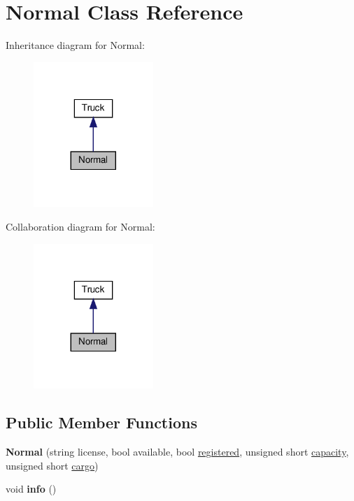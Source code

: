\hypertarget{class_normal}{}\section{Normal Class Reference}
\label{class_normal}


Inheritance diagram for Normal\+:\nopagebreak
\begin{figure}[H]
\begin{center}
\leavevmode
\includegraphics[width=128pt]{class_normal__inherit__graph}
\end{center}
\end{figure}


Collaboration diagram for Normal\+:\nopagebreak
\begin{figure}[H]
\begin{center}
\leavevmode
\includegraphics[width=128pt]{class_normal__coll__graph}
\end{center}
\end{figure}
\subsection*{Public Member Functions}
\begin{DoxyCompactItemize}
\item 
\mbox{\label{class_normal_a5bfcd1d763c6cf56bdcf4de370903da7}} 
{\bfseries Normal} (string license, bool available, bool \hyperlink{class_truck_a80b8405cf7a15b236fef70116f99c4fb}{registered}, unsigned short \hyperlink{class_truck_a14541fad6d47c606ce4e1bd150a68a23}{capacity}, unsigned short \hyperlink{class_truck_a968fc6b1a6171a03e4254d6615da4ecd}{cargo})
\item 
\mbox{\label{class_normal_ade6add2ee09e701113534c97e2a03307}} 
void {\bfseries info} ()
\end{DoxyCompactItemize}

